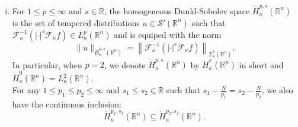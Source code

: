 \documentclass[a4paper,11pt, reqno]{amsart}
\numberwithin{equation}{section}
\theoremstyle{plain}
\theoremstyle{definition}
\theoremstyle{remark}
\begin{document}
\begin{enumerate}[(i)]
\item For $1\leq p\leq \infty$ and $s\in\mathbb{R}$, the homogeneous Dunkl-Sobolev space $\dot{H}_\kappa^{p,s}\left(\mathbb{R}^{n}\right)$ is the set of tempered distributions $u \in \mathcal{S}'\left(\mathbb{R}^{n}\right)$ such that $\mathcal{F}^{-1}_\kappa\left(|\cdot|^s \mathcal{F}_\kappa f\right)\in L_\kappa^p\left(\mathbb{R}^{n}\right)$ and is equiped with the norm 
\begin{equation*}
\|u\|_{\dot{H}_\kappa^{p,s}\left(\mathbb{R}^{n}\right)}=\left\|\mathcal{F}^{-1}_\kappa\left(|\cdot|^s \mathcal{F}_\kappa f\right)\right\|_{L_\kappa^p\left(\mathbb{R}^{n}\right)}.
\end{equation*}
In particular, when $p=2$, we denote $\dot{H}_\kappa^{p,s}\left(\mathbb{R}^{n}\right)$ by $\dot{H}_\kappa^{s}\left(\mathbb{R}^{n}\right)$ in short and $\dot{H}_\kappa^{0}\left(\mathbb{R}^{n}\right)=L_\kappa^2\left(\mathbb{R}^{n}\right)$.\\
 For any $1\leq p_1\leq p_2\leq\infty$ and $s_1\leq s_2 \in\mathbb{R}$ such that $s_1-\frac{N}{p_1}=s_2-\frac{N}{p_2}$, we also have the  continuous inclusion:  
\begin{equation}\label{Sobolev-Embedding}
\dot{H}_\kappa^{p_1,s_1} (\mathbb{R}^n)\subseteq \dot{H}_\kappa^{p_2,s_2} (\mathbb{R}^n).
\end{equation}

\end{enumerate}
\end{document}
